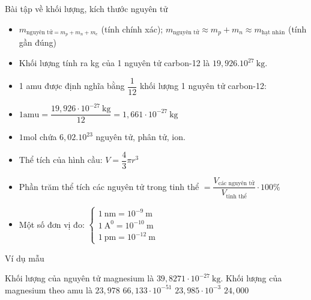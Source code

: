
\newpage
\begin{dangntd}{Bài tập về khối lượng, kích thước nguyên tử}	
	\\
	\begin{itemize}
		\item $ m _{\text{nguyên tử}=m_{p}+m_{n} + m_{e} } $ (tính chính xác); $ m _{\text{nguyên tử}} \approx  m_{p} + m_{n} \approx m_{\text{hạt nhân}} $ (tính gần đúng)
		\item Khối lượng tính ra kg của 1 nguyên tử carbon-12 là $ 19,926 . 10^{27}~\mathrm{kg}$.
		\item 1 amu được định nghĩa bằng $\dfrac{1}{12}$ khối lượng 1 nguyên tử carbon-12:
		\item$1 \mathrm{amu}=\dfrac{19,926 \cdot 10^{-27} \mathrm{~kg}}{12}=1,661 \cdot 10^{-27} \mathrm{~kg}$
		\item$1 \mathrm{mol}$ chứa $ 6,02.10^{23} $ nguyên tử, phân tử, ion.
	\end{itemize}
	\begin{itemize}
		\item Thể tích của hình cầu:
		$ V=\dfrac{4}{3}\pi r^3 $
		\item Phần trăm thể tích các nguyên tử trong tinh thể $ = \dfrac{V_{\text{các nguyên tử}}}{V_{\text{tinh thể}}}\cdot 100\% $
		\item Một số đơn vị đo: 
		$\left\{\begin{array}{l}
			1~\mathrm{nm} = 10^{-9}~\mathrm{m}\\
			1~\mathrm{A^{0}} = 10^{-10}~\mathrm{m}\\
			1~\mathrm{pm} = 10^{-12}~\mathrm{m}	
		\end{array}\right.$
	\end{itemize}
\end{dangntd}
\begin{vdm}{Ví dụ mẫu}
\end{vdm}


\begin{vdex}[2]	
	Khối lượng của nguyên tử magnesium là $39,8271 \cdot 10^{-27} \mathrm{~kg}$. Khối lượng của magnesium theo amu là
	\choice
	{%
		\True $ 23,978 $
	}
	{%
		$66,133 \cdot 10^{-51}$
	}
	{%
		$23,985 \cdot 10^{-3}$
	}
	{%
		$ 24,000 $
	}
	\huongdan{
		
	}	
\end{vdex}

